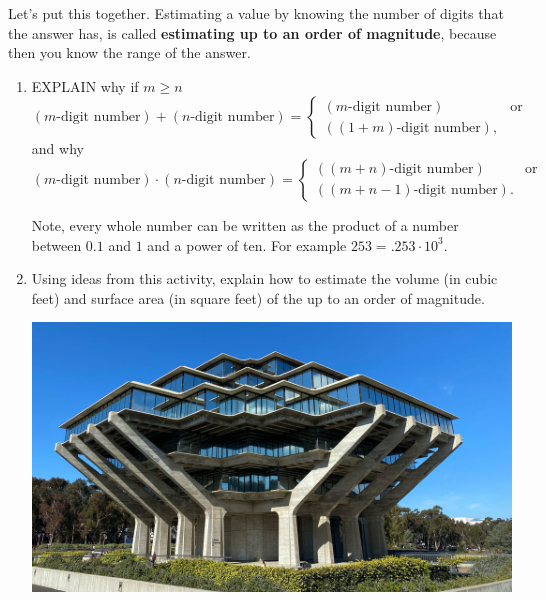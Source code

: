\documentclass[nooutcomes,noauthor,hints]{ximera}
\begin{document}
\mynewpage



















\begin{question}
  Let's put this together. Estimating a value by knowing the number
  of digits that the answer has, is called \textbf{estimating up to an
    order of magnitude}, because then you know the range of the
  answer.
  \begin{enumerate}
  \item EXPLAIN why if $m\ge n$
    \[
    (\text{$m$-digit number}) + (\text{$n$-digit number}) =
    \begin{cases}
      (\text{$m$-digit number}) & \text{or}\\
      (\text{$(1+m)$-digit number}),
    \end{cases}
    \]
    and why
    \[
    (\text{$m$-digit number}) \cdot (\text{$n$-digit number}) = \begin{cases}
      (\text{$(m+n)$-digit number}) & \text{or}\\
      (\text{$(m+n-1)$-digit number}).
    \end{cases}
    \]
    \begin{hint}
    Note, every whole number can be written as the product of a number
    between $0.1$ and $1$ and a power of ten. For example $253 =
    .253\cdot 10^3$.
  \end{hint}
  \item Using ideas from this activity, explain how to estimate the
    volume (in cubic feet) and surface area (in square feet) of the  up to an
    order of magnitude.

  \begin{center}
    \includegraphics[width=.4\textwidth]{geisel.jpg} 
  \end{center}


\end{enumerate}
\end{question}
\end{document}
